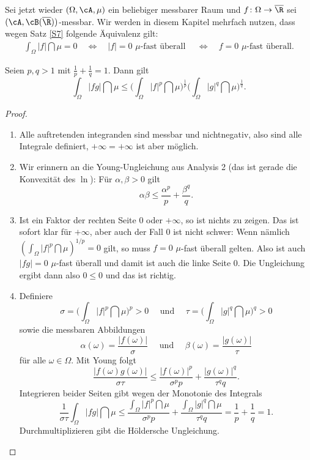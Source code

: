 Sei jetzt wieder $(\Omega, \cA, \mu)$ ein beliebiger messbarer Raum und $f \colon \Omega \to \overline \R$ sei $(\cA, \cB(\overline{\R}))$-messbar. Wir werden in diesem Kapitel mehrfach nutzen, dass wegen Satz \ref{S7} folgende \"Aquivalenz gilt:
\begin{align*}
\int_{\Omega} |f| \dint \mu = 0 \quad \Leftrightarrow \quad  |f| = 0 \, \, \mu \text{-fast überall }\quad \Leftrightarrow\quad f = 0 \, \,\mu\text{-fast überall.}
\end{align*}

\begin{satz}\label{hoelder}
	Seien $p,q > 1$ mit $ \frac{1}{p} + \frac{1}{q} = 1$. Dann gilt 
	\[ \int_{\Omega} |fg| \dint \mu \leq \Big( \int_{\Omega} |f|^p \dint \mu \Big)^{\frac{1}{p}} \Big( \int_{\Omega} |g|^q \dint \mu \Big)^{\frac{1}{q}}. \]
\end{satz}

\begin{proof}
	\begin{enumerate}[label=(\roman*)]
		\item Alle auftretenden integranden sind messbar und nichtnegativ, also sind alle Integrale definiert, $+\infty = +\infty$ ist aber möglich.
		\item Wir erinnern an die Young-Ungleichung aus Analysis 2 (das ist gerade die Konvexität des $\ln$): F\"ur $\alpha, \beta >0$ gilt
		\[ \alpha \beta \leq \frac{\alpha^p}{p} + \frac{\beta^q}{q}. \]
		\item Ist ein Faktor der rechten Seite $0$ oder $+ \infty$, so ist nichts zu zeigen. Das ist sofort klar für $+\infty$, aber auch der Fall $0$ ist nicht schwer: Wenn n\"amlich
		$ (\int_{\Omega} |f|^p \dint \mu )^{1/p}= 0$ gilt, so muss $f = 0$ $\mu$-fast überall gelten. Also ist auch $|fg| = 0$ $\mu$-fast überall und damit ist auch die linke Seite $0$. Die Ungleichung ergibt dann also $0\leq 0$ und das ist richtig.
		\item Definiere \[ \sigma = \Big( \int_{\Omega} |f|^p \dint \mu \Big)^{p} > 0\quad \text{ und } \quad \tau = \Big( \int_{\Omega} |g|^q \dint \mu \Big)^{q} > 0 \]
		sowie die messbaren Abbildungen
		\[ \alpha(\omega) =  \frac{|f(\omega)|}{\sigma} \quad \text{ und }\quad \beta(\omega) =  \frac{|g(\omega)|}{\tau}  \]
		f\"ur alle $\omega\in \Omega$.
		Mit Young folgt \[ \frac{|f(\omega) g(\omega)|}{\sigma \tau} \leq \frac{|f(\omega)|^p}{\sigma^p p} + \frac{|g(\omega)|^q}{\tau^q q}. \]
		Integrieren beider Seiten gibt wegen der Monotonie des Integrals
		\[ \frac{1}{\sigma \tau} \int_{\Omega} |fg| \dint \mu \leq \frac{\int_{\Omega}|f|^p \dint \mu}{\sigma^p p} + \frac{\int_{\Omega}|g|^q \dint \mu}{\tau^q q} = \frac{1}{p} + \frac{1}{q} = 1. \]
		Durchmultiplizieren gibt die H\"oldersche Ungleichung.
	\end{enumerate}
\end{proof}